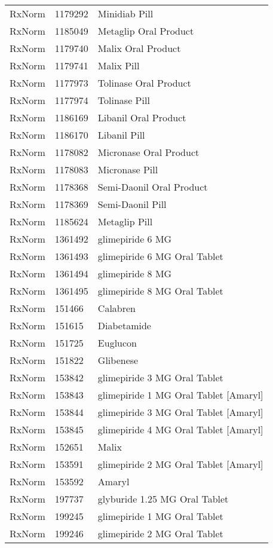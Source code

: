 \begin{longtable}{p{}p{}p{}}
  RxNorm & 1179292 & Minidiab Pill \\ 
  RxNorm & 1185049 & Metaglip Oral Product \\ 
  RxNorm & 1179740 & Malix Oral Product \\ 
  RxNorm & 1179741 & Malix Pill \\ 
  RxNorm & 1177973 & Tolinase Oral Product \\ 
  RxNorm & 1177974 & Tolinase Pill \\ 
  RxNorm & 1186169 & Libanil Oral Product \\ 
  RxNorm & 1186170 & Libanil Pill \\ 
  RxNorm & 1178082 & Micronase Oral Product \\ 
  RxNorm & 1178083 & Micronase Pill \\ 
  RxNorm & 1178368 & Semi-Daonil Oral Product \\ 
  RxNorm & 1178369 & Semi-Daonil Pill \\ 
  RxNorm & 1185624 & Metaglip Pill \\ 
  RxNorm & 1361492 & glimepiride 6 MG \\ 
  RxNorm & 1361493 & glimepiride 6 MG Oral Tablet \\ 
  RxNorm & 1361494 & glimepiride 8 MG \\ 
  RxNorm & 1361495 & glimepiride 8 MG Oral Tablet \\ 
  RxNorm & 151466 & Calabren \\ 
  RxNorm & 151615 & Diabetamide \\ 
  RxNorm & 151725 & Euglucon \\ 
  RxNorm & 151822 & Glibenese \\ 
  RxNorm & 153842 & glimepiride 3 MG Oral Tablet \\ 
  RxNorm & 153843 & glimepiride 1 MG Oral Tablet [Amaryl] \\ 
  RxNorm & 153844 & glimepiride 3 MG Oral Tablet [Amaryl] \\ 
  RxNorm & 153845 & glimepiride 4 MG Oral Tablet [Amaryl] \\ 
  RxNorm & 152651 & Malix \\ 
  RxNorm & 153591 & glimepiride 2 MG Oral Tablet [Amaryl] \\ 
  RxNorm & 153592 & Amaryl \\ 
  RxNorm & 197737 & glyburide 1.25 MG Oral Tablet \\ 
  RxNorm & 199245 & glimepiride 1 MG Oral Tablet \\ 
  RxNorm & 199246 & glimepiride 2 MG Oral Tablet \\ 

\end{longtable}
